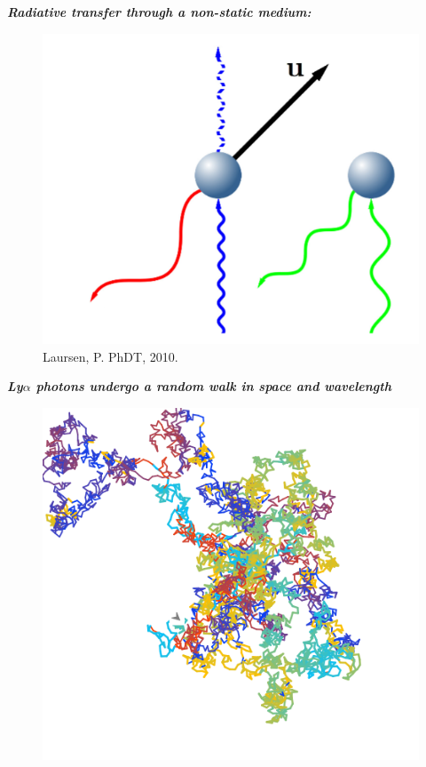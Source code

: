 \documentclass{beamer}
\begin{document}
\begin{frame}{\textit{\textbf{Radiative transfer through a non-static medium:}}}
\begin{figure}
\includegraphics[scale=0.4]{Figures/xshift.png}
\caption*{Laursen, P. PhDT, 2010.}
\end{figure}
\end{frame}


\begin{frame}{\textit{\textbf{Ly$\alpha$ photons undergo a random walk in space and wavelength}}}
\begin{figure}
\includegraphics[scale=0.4]{Figures/rand_walk.png}
\end{figure}
\end{frame}
\end{document}
